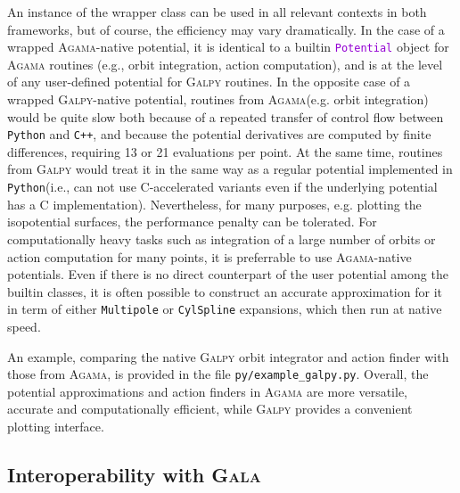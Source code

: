 \documentclass[12pt]{article}
\newcommand{\Agama}{\textsc{Agama}\xspace}
\newcommand{\Galpy}{\textsc{Galpy}\xspace}
\newcommand{\Gala} {\textsc{Gala}\xspace}
\newcommand{\Cpp}  {\texttt{C++}\xspace}
\newcommand{\Python}{\texttt{Python}\xspace}
\newcommand{\ttt}[1]{\textcolor{darkviolet}{\texttt{#1}}}
\newcommand{\ppp}[1]{\textcolor{darkolive} {\texttt{#1}}}
\begin{document}
An instance of the wrapper class can be used in all relevant contexts in both frameworks, but of course, the efficiency may vary dramatically. In the case of a wrapped \Agama-native potential, it is identical to a builtin \ttt{Potential} object for \Agama routines (e.g., orbit integration, action computation), and is at the level of any user-defined potential for \Galpy routines. In the opposite case of a wrapped \Galpy-native potential, routines from \Agama (e.g. orbit integration) would be quite slow both because of a repeated transfer of control flow between \Python and \Cpp, and because the potential derivatives are computed by finite differences, requiring 13 or 21 evaluations per point. At the same time, routines from \Galpy would treat it in the same way as a regular potential implemented in \Python (i.e., can not use C-accelerated variants even if the underlying potential has a C implementation). Nevertheless, for many purposes, e.g. plotting the isopotential surfaces, the performance penalty can be tolerated. For computationally heavy tasks such as integration of a large number of orbits or action computation for many points, it is preferrable to use \Agama-native potentials. Even if there is no direct counterpart of the user potential among the builtin classes, it is often possible to construct an accurate approximation for it in term of either \ppp{Multipole} or \ppp{CylSpline} expansions, which then run at native speed.

An example, comparing the native \Galpy orbit integrator and action finder with those from \Agama, is provided in the file \texttt{py/example_galpy.py}. Overall, the potential approximations and action finders in \Agama are more versatile, accurate and computationally efficient, while \Galpy provides a convenient plotting interface.


\subsection{Interoperability with \Gala}  \label{sec:Gala}
\end{document}
